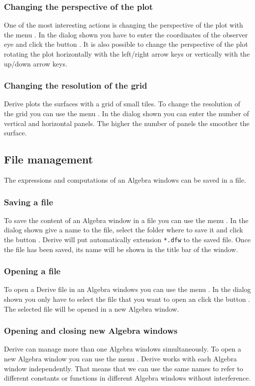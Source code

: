 \subsubsection*{Changing the perspective of the plot}
One of the most interesting actions is changing the perspective of the plot with the menu .
In the dialog shown you have to enter the coordinates of the observer eye and click the button .
It is also possible to change the perspective of the plot rotating the plot horizontally with the left/right arrow keys or vertically with the up/down arrow keys. 

\subsubsection*{Changing the resolution of the grid}
Derive plots the surfaces with a grid of small tiles. 
To change the resolution of the grid you can use the menu . 
In the dialog shown you can enter the number of vertical and horizontal panels.
The higher the number of panels the smoother the surface. 


\subsection*{File management}
The expressions and computations of an Algebra windows can be saved in a file.

\subsubsection*{Saving a file}
To save the content of an Algebra window in a file you can use the menu .
In the dialog shown give a name to the file, select the folder where to save it and click the button .
Derive will put automatically extension \texttt{*.dfw} to the saved file. 
Once the file has been saved, its name will be shown in the title bar of the window. 


\subsubsection*{Opening a file}
To open a Derive file in an Algebra windows you can use the menu .
In the dialog shown you only have to select the file that you want to open an click the button .
The selected file will be opened in a new Algebra window.


\subsubsection*{Opening and closing new Algebra windows}
Derive can manage more than one Algebra windows simultaneously. 
To open a new Algebra window you can use the menu . 
Derive works with each Algebra window independently.
That means that we can use the same names to refer to different constants or functions in different Algebra windows without interference. 

